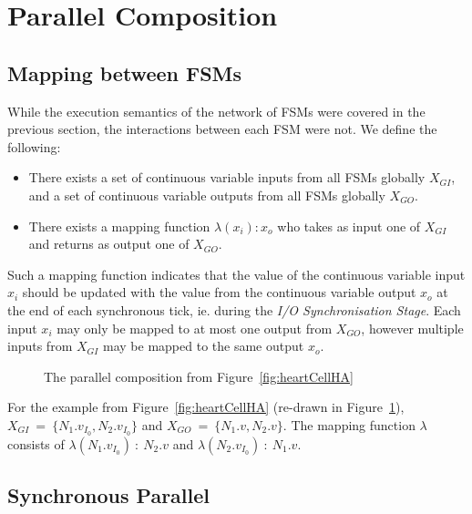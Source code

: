 \section{Parallel Composition}
\label{sec:composition}


\subsection{Mapping between \acp{FSM}}
\label{sec:mapping}

While the execution semantics of the network of \acp{FSM} were covered in the 
previous section, the interactions between each \ac{FSM} were not.  We define 
the following:
\begin{itemize}
	\item There exists a set of continuous variable inputs from all \acp{FSM} 
	globally $X_{GI}$, and a set of continuous variable outputs from all 
	\acp{FSM} globally $X_{GO}$.
	\item There exists a mapping function $\lambda(x_i) : x_o$ who takes as 
	input one of $X_{GI}$ and returns as output one of $X_{GO}$.
\end{itemize}

Such a mapping function indicates that the value of the continuous variable 
input $x_i$ should be updated with the value from the continuous variable 
output $x_o$ at the end of each synchronous tick, ie. during the \emph{I/O 
Synchronisation Stage}.  Each input $x_i$ may only be mapped to at most one 
output from $X_{GO}$, however multiple inputs from $X_{GI}$ may be mapped to 
the same output $x_o$.

\begin{figure}
	\centering
	
	\caption{The parallel composition from Figure~\ref{fig:heartCellHA} 
		\label{fig:networkComposition}}
\end{figure}

For the example from Figure~\ref{fig:heartCellHA} (re-drawn in 
Figure~\ref{fig:networkComposition}), 
$X_{GI}~=~\{N_{1}.v_{I_{0}},N_{2}.v_{I_{0}}\}$ and 
$X_{GO}~=~\{N_{1}.v,N_{2}.v\}$. 
The mapping function $\lambda$ consists of 
$\lambda(N_{1}.v_{I_{0}})~:~N_{2}.v$ and $\lambda(N_{2}.v_{I_{0}})~:~N_{1}.v$.

\subsection{Synchronous Parallel}
\label{sec:synchronousParallel}

